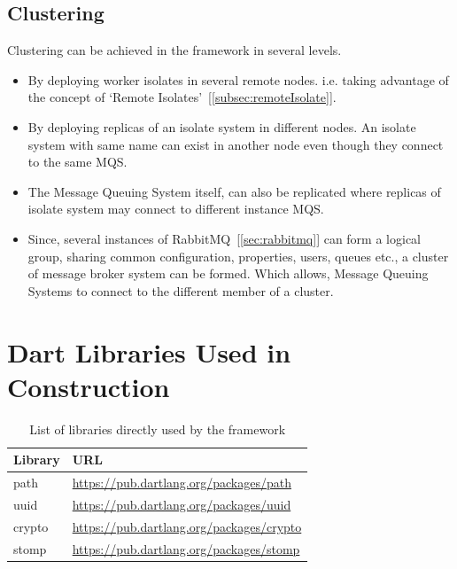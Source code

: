 \subsection{Clustering}
  Clustering can be achieved in the framework in several levels.
  \begin{itemize}
  \item By deploying worker isolates in several remote nodes. i.e. taking advantage of the concept of ‘Remote Isolates’~[\autoref{subsec:remoteIsolate}].
  \item By deploying replicas of an isolate system in different nodes. An isolate system with same name can exist in another node even though they connect to the same MQS.
  \item The Message Queuing System itself, can also be replicated where replicas of isolate system may connect to different instance MQS.
  \item Since, several instances of RabbitMQ~[\autoref{sec:rabbitmq}] can form a logical group, sharing common configuration, properties, users, queues etc., a cluster of message broker system can be formed. Which allows, Message Queuing Systems to connect to the different member of a cluster.
  \end{itemize}

\section{Dart Libraries Used in Construction}
\begin{table}[htsb]
  \caption[Dependent libraries of the framework]{List of libraries directly used by the framework}\label{tab:libraries}
  \centering
  \begin{tabular}{l l}
    \toprule
      Library & URL \\
    \midrule
      path &  \url{https://pub.dartlang.org/packages/path}\\
      uuid &  \url{https://pub.dartlang.org/packages/uuid}\\
      crypto &  \url{https://pub.dartlang.org/packages/crypto}\\
      stomp &  \url{https://pub.dartlang.org/packages/stomp}\\
    \bottomrule
  \end{tabular}
\end{table}

